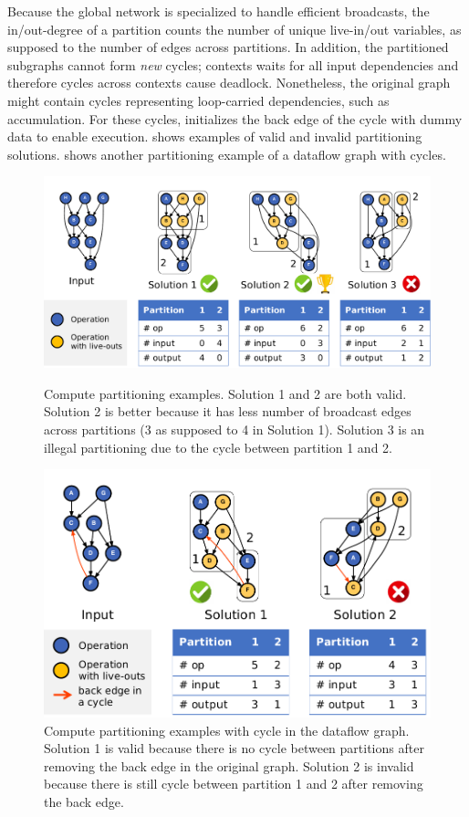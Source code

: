 Because the global network is specialized to handle efficient broadcasts, 
the in/out-degree of a partition counts the number of unique live-in/out variables, as supposed to
the number of edges across partitions.
In addition, the partitioned subgraphs cannot form {\em new} cycles; contexts waits for all
input dependencies and therefore cycles across contexts cause deadlock. 
Nonetheless, the original graph might contain cycles representing loop-carried dependencies, such as
accumulation. For these cycles, \name initializes the back edge of the cycle with dummy data to
enable execution.
 shows examples of valid and invalid partitioning solutions.
 shows another partitioning example of a dataflow graph with cycles.

\begin{figure}
  \centering
  \includegraphics[width=1\columnwidth]{figs/parteg.pdf}
  \caption[Compute partitioning examples]{
    Compute partitioning examples. Solution 1 and 2 are both valid. Solution 2 is
    better because it has less number of broadcast edges across partitions (3 as supposed to 4 in Solution 1). 
    Solution 3 is an illegal partitioning due to the cycle between partition 1 and 2.
  }
  \label{fig:parteg}

  \includegraphics[width=0.8\columnwidth]{figs/partcycleeg.pdf}
  \caption[Compute partitioning examples with cycle]{
    Compute partitioning examples with cycle in the dataflow graph.
    Solution 1 is valid because there is no 
    cycle between partitions after removing the back edge in
    the original graph.
    Solution 2 is invalid because there is still cycle between partition 1 and 2 after
    removing the back edge.
  }
  \label{fig:partcycleeg}
\end{figure}

